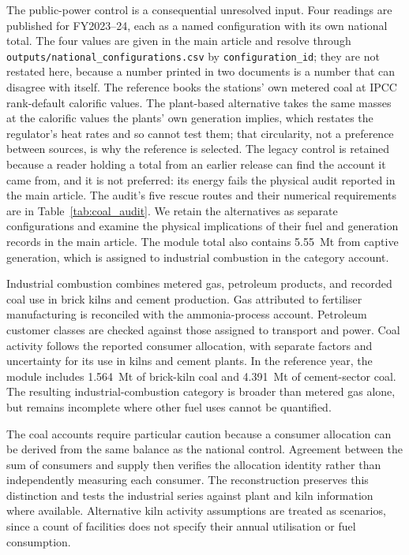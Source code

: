 \documentclass[essd]{copernicus}
\begin{document}
The public-power control is a consequential unresolved input. Four readings are published for FY2023--24, each as a named configuration with its own national total. The four values are given in the main article and resolve through \texttt{outputs/national\_configurations.csv} by \texttt{configuration\_id}; they are not restated here, because a number printed in two documents is a number that can disagree with itself. The reference books the stations' own metered coal at IPCC rank-default calorific values. The plant-based alternative takes the same masses at the calorific values the plants' own generation implies, which restates the regulator's heat rates and so cannot test them; that circularity, not a preference between sources, is why the reference is selected. The legacy control is retained because a reader holding a total from an earlier release can find the account it came from, and it is not preferred: its energy fails the physical audit reported in the main article. The audit's five rescue routes and their numerical requirements are in Table~\ref{tab:coal_audit}.
 We retain the alternatives as separate configurations and examine the physical implications of their fuel and generation records in the main article. The module total also contains 5.55~Mt from captive generation, which is assigned to industrial combustion in the category account.

Industrial combustion combines metered gas, petroleum products, and recorded coal use in brick kilns and cement production. Gas attributed to fertiliser manufacturing is reconciled with the ammonia-process account. Petroleum customer classes are checked against those assigned to transport and power. Coal activity follows the reported consumer allocation, with separate factors and uncertainty for its use in kilns and cement plants. In the reference year, the module includes 1.564~Mt of brick-kiln coal and 4.391~Mt of cement-sector coal. The resulting industrial-combustion category is broader than metered gas alone, but remains incomplete where other fuel uses cannot be quantified.

The coal accounts require particular caution because a consumer allocation can be derived from the same balance as the national control. Agreement between the sum of consumers and supply then verifies the allocation identity rather than independently measuring each consumer. The reconstruction preserves this distinction and tests the industrial series against plant and kiln information where available. Alternative kiln activity assumptions are treated as scenarios, since a count of facilities does not specify their annual utilisation or fuel consumption.
\end{document}
